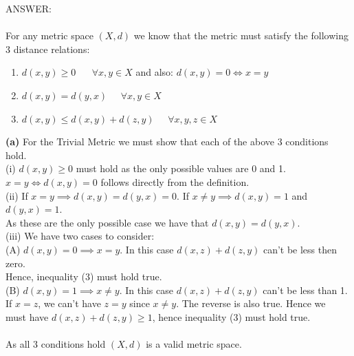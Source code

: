 \documentclass[12pt]{article}
\begin{document}
\vspace{1cm}
\noindent
ANSWER:\\
\\
For any metric space $(X, d)$ we know that the metric must satisfy the following 3 distance relations:
\begin{enumerate}
\item $d(x, y) \ge 0 \;\;\;\;\;\; \forall x, y \in X$ and also: $d(x, y) = 0 \iff x=y$
\item $d(x, y) = d(y, x) \;\;\;\;\;  \forall x, y \in X$
\item $d(x, y) \le d(x, y) + d(z, y) \;\;\;\;\;  \forall x, y, z \in X$
\end{enumerate}
\textbf{(a)} For the Trivial Metric we must show that each of the above 3 conditions hold.\\
(i) $d(x,y) \ge 0$ must hold as the only possible values are 0 and 1.\\
\hspace*{0.5cm}$x=y \iff d(x,y) = 0$ follows directly from the definition.\\
(ii) If $x=y \implies d(x,y) = d(y,x) = 0$.  If $x \ne y \implies d(x,y) = 1$ and $d(y, x) = 1$.\\
\hspace*{0.5cm}As these are the only possible case we have that $d(x,y)=d(y,x)$.\\
(iii) We have two cases to consider:\\
\hspace*{0.75cm}(A) $d(x,y) = 0 \implies x=y$.  In this case $d(x,z) + d(z, y)$ can't be less then zero.\\
\hspace*{0.75cm}Hence, inequality (3) must hold true.\\
\hspace*{0.75cm}(B) $d(x,y)=1 \implies x \ne y$.  In this case $d(x,z) + d(z, y)$ can't be less than 1.\\
\hspace*{0.75cm}If $x=z$, we can't have $z=y$ since $x \ne y$.  The reverse is also true.  Hence we\\
\hspace*{0.75cm}must have $d(x,z)+d(z,y) \ge 1$, hence inequality (3) must hold true.\\
\\
As all 3 conditions hold $(X,d)$ is a valid metric space.
\end{document}
